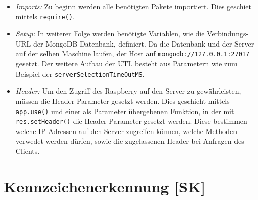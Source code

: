\begin{itemize}
    \item \textit{Imports: } Zu beginn werden alle benötigten Pakete importiert. Dies geschiet mittels \verb|require()|.
    \item \textit{Setup:  } In weiterer Folge werden benötigte Variablen, wie die Verbindungs-URL der MongoDB Datenbank, definiert. Da die Datenbank und der Server auf der selben Maschine laufen, der Host auf \verb|mongodb://127.0.0.1:27017| gesetzt. Der weitere Aufbau der UTL besteht aus Parametern wie zum Beispiel der \verb|serverSelectionTimeOutMS|.
    \item \textit{Header: } Um den Zugriff des Raspberry auf den Server zu gewährleisten, müssen die Header-Parameter gesetzt werden. Dies geschieht mittels \verb|app.use()| und einer als Parameter übergebenen Funktion, in der mit \verb|res.setHeader()| die Header-Parameter gesetzt werden. Diese bestimmen welche IP-Adressen auf den Server zugreifen können, welche Methoden verwedet werden dürfen, sowie die zugelassenen Header bei Anfragen des Clients.
\end{itemize}
\section{Kennzeichenerkennung [SK]}
